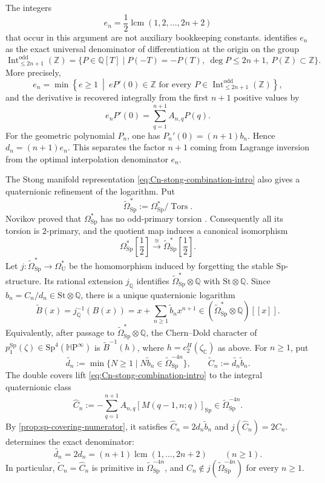 \documentclass[14pt,dvipsnames]{extarticle}
\numberwithin{equation}{subsection}
\theoremstyle{plain}
\theoremstyle{definition}
\theoremstyle{definition}
\DeclareMathOperator{\lcm}{lcm}
\DeclareMathOperator{\Tors}{Tors}
\newcommand{\OmU}{\Omega_{\mathrm U}^{\ast}}
\newcommand{\OmSp}{\Omega_{\mathrm{Sp}}^{\ast}}
\newcommand{\OmSpfree}{\widetilde{\Omega}_{\mathrm{Sp}}}
\newcommand{\HP}{\mathbb{H}\mathrm P}
\newcommand{\Sp}{\mathrm{Sp}}
\newcommand{\St}{\mathrm{St}}
\newcommand{\Q}{\mathbb{Q}}
\begin{document}
The integers
\[
 e_n=\frac12\lcm(1,2,\ldots,2n+2)
\]
that occur in this argument are not auxiliary bookkeeping constants.
 identifies $e_n$ as the exact universal
denominator of differentiation at the origin on the group
\[
 \operatorname{Int}^{\mathrm{odd}}_{\leq2n+1}(\mathbb Z)
 =\{P\in\mathbb Q[T]\mid P(-T)=-P(T),\ 
      \deg P\leq2n+1,\ P(\mathbb Z)\subset\mathbb Z\}.
\]
More precisely,
\[
 e_n
 =\min\left\{e\geq1\ \middle|\
   eP'(0)\in\mathbb Z
   \text{ for every }P\in
   \operatorname{Int}^{\mathrm{odd}}_{\leq2n+1}(\mathbb Z)
  \right\},
\]
and the derivative is recovered integrally from the first $n+1$ positive
values by
\[
 e_nP'(0)=\sum_{q=1}^{n+1}A_{n,q}P(q).
\]
For the geometric polynomial $P_n$, one has
$P_n'(0)=(n+1)b_n$. Hence
$d_n=(n+1)e_n$. This separates the factor $n+1$ coming from Lagrange inversion
from the optimal interpolation denominator $e_n$.

The Stong manifold representation \eqref{eq:Cn-stong-combination-intro} also
gives a quaternionic refinement of the logarithm. Put
\[
 \OmSpfree^{\ast}:=\OmSp/\Tors.
\]
Novikov proved that $\Omega_{\mathrm{Sp}}^{\ast}$ has no odd-primary torsion
\cite[Theorem~4, p.~428]{Nov62}. Consequently all its torsion is $2$-primary,
and the quotient map induces a canonical isomorphism
\[
 \Omega_{\mathrm{Sp}}^{\ast}\!\left[\frac12\right]
 \xrightarrow{\ \cong\ }
 \widetilde{\Omega}_{\mathrm{Sp}}^{\ast}\!\left[\frac12\right].
\]
Let $j\colon\OmSpfree^{\ast}\longrightarrow\OmU$ be the homomorphism
induced by forgetting the stable $\Sp$-structure. Its rational extension $j_{\Q}$
identifies $\OmSpfree^{\ast}\otimes\Q$ with $\St\otimes\Q$. Since
$b_n=C_n/d_n\in\St\otimes\Q$, there is a unique quaternionic logarithm
\[
 \widetilde B(x)
 =j_{\Q}^{-1}(B(x))
 =x+\sum_{n\geq1}\widetilde b_nx^{n+1}
 \in(\OmSpfree^{\ast}\otimes\Q)[[x]].
\]
Equivalently, after passage to $\OmSpfree^{\ast}\otimes\Q$, the Chern--Dold
character of $p_1^{\Sp}(\zeta)\in\Sp^4(\HP^\infty)$ is
$\widetilde B^{-1}(h)$, where $h=c_2^H(\zeta_{\mathbb C})$ as above. For
$n\geq1$, put
\[
 \widetilde{d_n}
 :=\min\{N\geq1\mid N\widetilde b_n\in\OmSpfree^{-4n}\},
 \qquad
 \widetilde C_n:=\widetilde{d_n}\widetilde b_n.
\]
The double covers lift \eqref{eq:Cn-stong-combination-intro} to the integral
quaternionic class
\[
 \widehat C_n
 :=-\sum_{q=1}^{n+1}A_{n,q}[M(q-1,n;q)]_{\Sp}
 \in\OmSpfree^{-4n}.
\]
By \cref{prop:sp-covering-numerator}, it satisfies
$\widehat C_n=2d_n\widetilde b_n$ and $j(\widehat C_n)=2C_n$.
\Cref{thm:sp-denominator} determines the exact denominator:
\[
 \widetilde{d_n}=2d_n
 =(n+1)\lcm(1,\ldots,2n+2)
 \qquad(n\geq1).
\]
In particular, $\widetilde C_n=\widehat C_n$ is primitive in
$\OmSpfree^{-4n}$, and $C_n\notin j(\OmSpfree^{-4n})$ for every $n\geq1$.
\end{document}
